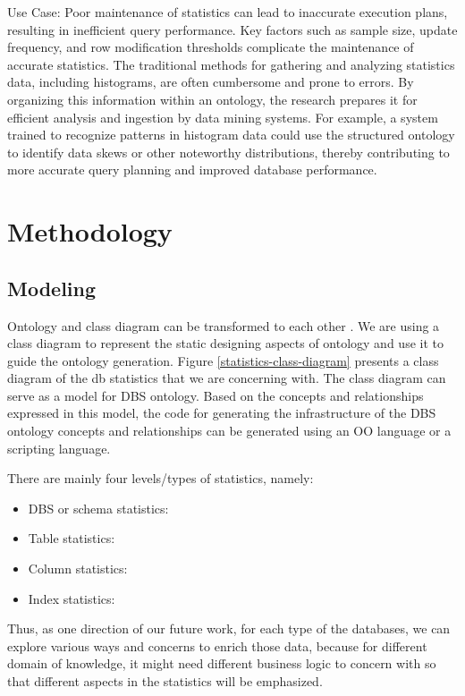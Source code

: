 \documentclass[sigconf]{acmart}
\begin{document}
Use Case: Poor maintenance of statistics can lead to inaccurate execution plans, resulting in inefficient query performance. Key factors such as sample size, update frequency, and row modification thresholds complicate the maintenance of accurate statistics. The traditional methods for gathering and analyzing statistics data, including histograms, are often cumbersome and prone to errors. By organizing this information within an ontology, the research prepares it for efficient analysis and ingestion by data mining systems. For example, a system trained to recognize patterns in histogram data could use the structured ontology to identify data skews or other noteworthy distributions, thereby contributing to more accurate query planning and improved database performance.

\section{Methodology}

\subsection{Modeling}
Ontology and class diagram can be transformed to each other \cite{mkhinini2020combining, vo2020transformation}. We are using a class diagram to represent the static designing aspects of ontology and use it to guide the ontology generation.  Figure \ref{statistics-class-diagram} presents a class diagram of the db statistics that we are concerning with. The class diagram can serve as a model for DBS ontology. Based on the concepts and relationships expressed in this model, the code for generating the infrastructure of the DBS ontology concepts and relationships can be generated using an OO language or a scripting language.

There are mainly four levels/types of statistics, namely:
\begin{itemize}
	\item DBS or schema statistics:
	\item Table statistics:
	\item Column statistics:
	\item Index statistics:
\end{itemize}

Thus, as one direction of our future work, for each type of the databases, we can explore various ways and concerns to enrich those data, because for different domain of knowledge, it might need different business logic to concern with so that different aspects in the statistics will be emphasized. 
\end{document}
